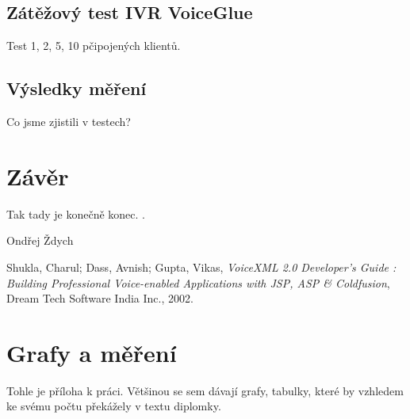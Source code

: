 \documentclass[ing,male,java,dept460]{diploma}						%
\begin{document}
\subsection{Zátěžový test IVR VoiceGlue}
Test 1, 2, 5, 10 pčipojených klientů.

\subsection{Výsledky měření}
Co jsme zjistili v testech?

\section{Závěr}
\label{sec:Conclusion}
Tak tady je konečně konec.
\cite{goossens94,lamport94}.

\bigskip
\begin{flushright}
Ondřej Ždych
\end{flushright}

\begin{thebibliography}{99}

 Shukla, Charul; Dass, Avnish; Gupta, Vikas,
\textit{VoiceXML 2.0 Developer's Guide : Building Professional Voice-enabled Applications with JSP, ASP & Coldfusion}, Dream Tech Software India Inc., 2002.

\end{thebibliography}


\appendix
\section{Grafy a měření}
Tohle je příloha k práci. Většinou se sem dávají grafy, tabulky, které by vzhledem
ke svému počtu překážely v textu diplomky.
\clearpage

\end{document}
